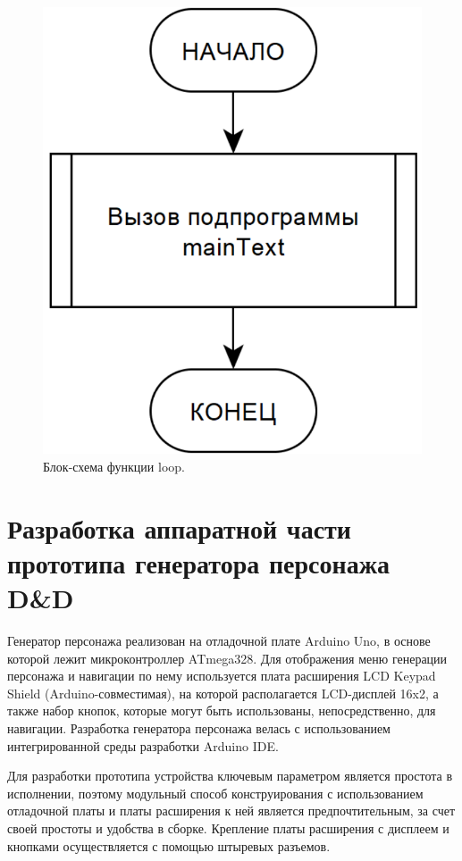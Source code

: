 \begin{figure}[H]
    \centering
    \includegraphics[scale=0.3]{loop.png}
    \caption{Блок-схема функции loop.}
    \label{fig:loop}
\end{figure}

\section{Разработка аппаратной части прототипа генератора персонажа D\&D}

Генератор персонажа реализован на отладочной плате Arduino Uno, в основе которой лежит микроконтроллер ATmega328. Для отображения меню генерации персонажа и навигации по нему используется плата расширения LCD Keypad Shield (Arduino-совместимая), на которой располагается LCD-дисплей 16x2, а также набор кнопок, которые могут быть использованы, непосредственно, для навигации. Разработка генератора персонажа велась с использованием интегрированной среды разработки Arduino IDE.

Для разработки прототипа устройства ключевым параметром является простота в исполнении, поэтому модульный способ конструирования с использованием отладочной платы и платы расширения к ней является предпочтительным, за счет своей простоты и удобства в сборке. Крепление платы расширения с дисплеем и кнопками осуществляется с помощью штыревых разъемов.

